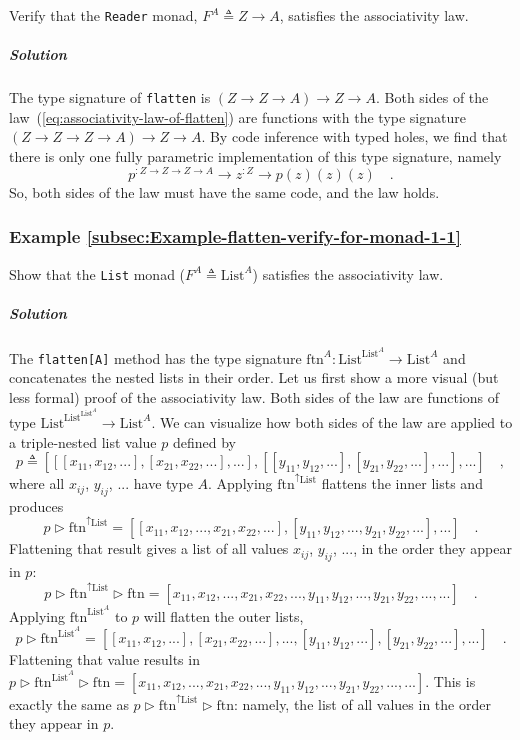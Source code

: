 Verify that the \lstinline!Reader! monad, $F^{A}\triangleq Z\rightarrow A$,
satisfies the associativity law.

\subparagraph{Solution}

The type signature of \lstinline!flatten! is $\left(Z\rightarrow Z\rightarrow A\right)\rightarrow Z\rightarrow A$.
Both sides of the law~(\ref{eq:associativity-law-of-flatten}) are
functions with the type signature $(Z\rightarrow Z\rightarrow Z\rightarrow A)\rightarrow Z\rightarrow A$.
By code inference with typed holes, we find that there is only one
fully parametric implementation of this type signature, namely
\[
p^{:Z\rightarrow Z\rightarrow Z\rightarrow A}\rightarrow z^{:Z}\rightarrow p(z)(z)(z)\quad.
\]
So, both sides of the law must have the same code, and the law holds.

\subsubsection{Example \label{subsec:Example-flatten-verify-for-monad-1-1}\ref{subsec:Example-flatten-verify-for-monad-1-1}}

Show that the \lstinline!List! monad ($F^{A}\triangleq\text{List}^{A}$)
satisfies the associativity law.

\subparagraph{Solution}

The \lstinline!flatten[A]! method has the type signature $\text{ftn}^{A}:\text{List}^{\text{List}^{A}}\rightarrow\text{List}^{A}$
and concatenates the nested lists in their order. Let us first show
a more visual (but less formal) proof of the associativity law. Both
sides of the law are functions of type $\text{List}^{\text{List}^{\text{List}^{A}}}\rightarrow\text{List}^{A}$.
We can visualize how both sides of the law are applied to a triple-nested
list value $p$ defined by
\[
p\triangleq\left[\left[\left[x_{11},x_{12},...\right],\left[x_{21},x_{22},...\right],...\right],\left[\left[y_{11},y_{12},...\right],\left[y_{21},y_{22},...\right],...\right],...\right]\quad,
\]
where all $x_{ij}$, $y_{ij}$, $...$ have type $A$. Applying $\text{ftn}^{\uparrow\text{List}}$
flattens the inner lists and produces
\[
p\triangleright\text{ftn}^{\uparrow\text{List}}=\left[\left[x_{11},x_{12},...,x_{21},x_{22},...\right],\left[y_{11},y_{12},...,y_{21},y_{22},...\right],...\right]\quad.
\]
Flattening that result gives a list of all values $x_{ij}$, $y_{ij}$,
..., in the order they appear in $p$:
\[
p\triangleright\text{ftn}^{\uparrow\text{List}}\triangleright\text{ftn}=\left[x_{11},x_{12},...,x_{21},x_{22},...,y_{11},y_{12},...,y_{21},y_{22},...,...\right]\quad.
\]
Applying $\text{ftn}^{\text{List}^{A}}$ to $p$ will flatten the
outer lists,
\[
p\triangleright\text{ftn}^{\text{List}^{A}}=\left[\left[x_{11},x_{12},...\right],\left[x_{21},x_{22},...\right],...,\left[y_{11},y_{12},...\right],\left[y_{21},y_{22},...\right],...\right]\quad.
\]
Flattening that value results in $p\triangleright\text{ftn}^{\text{List}^{A}}\triangleright\text{ftn}=\left[x_{11},x_{12},...,x_{21},x_{22},...,y_{11},y_{12},...,y_{21},y_{22},...,...\right]$.
This is exactly the same as $p\triangleright\text{ftn}^{\uparrow\text{List}}\triangleright\text{ftn}$:
namely, the list of all values in the order they appear in $p$.

